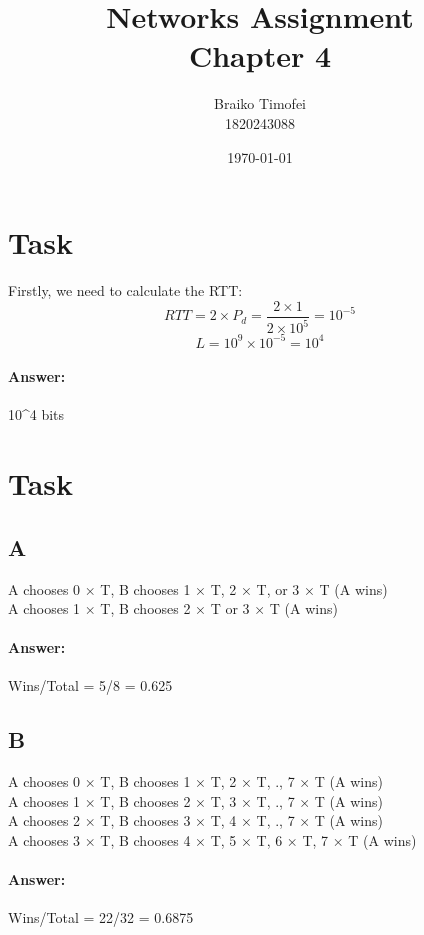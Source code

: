 \documentclass[11pt]{article}
\title{Networks Assignment\\ Chapter 4}
\author{Braiko Timofei\\1820243088}
\date{\today}
\begin{document}
    \section{Task}\label{sec:task-1}
    Firstly, we need to calculate the RTT:
    \begin{equation}
        RTT = 2 \times P_d = \frac{2 \times 1}{2 \times 10^5} = 10^{-5}
    \end{equation}
    \begin{equation}
        L = 10^9 \times 10^{-5} = 10^4
    \end{equation}
    \paragraph{Answer:} 10^4 bits
    \newpage


    \section{Task}\label{sec:task-2}

    \subsection{A}
    A chooses 0 × T, B chooses 1 × T, 2 × T, or 3 × T (A wins) \\
    A chooses 1 × T, B chooses 2 × T or 3 × T (A wins)\\
    \paragraph{Answer:} Wins/Total = 5/8 = 0.625

    \subsection{B}

    A chooses 0 × T, B chooses 1 × T, 2 × T, ., 7 × T (A wins) \\
    A chooses 1 × T, B chooses 2 × T, 3 × T, ., 7 × T (A wins) \\
    A chooses 2 × T, B chooses 3 × T, 4 × T, ., 7 × T (A wins) \\
    A chooses 3 × T, B chooses 4 × T, 5 × T, 6 × T, 7 × T (A wins)
    \paragraph{Answer:} Wins/Total = 22/32 = 0.6875

    \newpage
\end{document}
